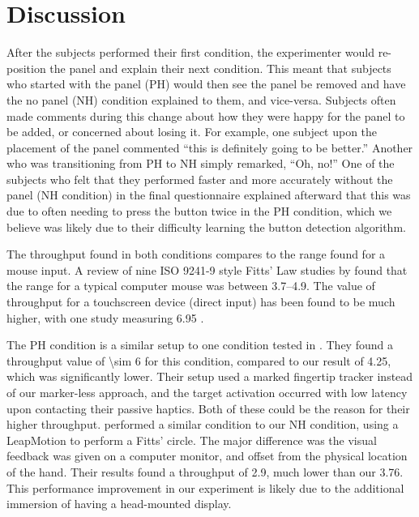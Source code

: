 \section{Discussion}

After the subjects performed their first condition, the experimenter would re-position the panel and explain their next condition.
This meant that subjects who started with the panel (PH) would then see the panel be removed and have the no panel (NH) condition explained to them, and vice-versa.
Subjects often made comments during this change about how they were happy for the panel to be added, or concerned about losing it.
For example, one subject upon the placement of the panel commented ``this is definitely going to be better.''
Another who was transitioning from PH to NH simply remarked, ``Oh, no!''
One of the subjects who felt that they performed faster and more accurately without the panel (NH condition) in the final questionnaire explained afterward that this was due to often needing to press the button twice in the PH condition, which we believe was likely due to their difficulty learning the button detection algorithm.

The throughput found in both conditions compares to the range found for a mouse input.
A review of nine ISO 9241-9 style Fitts' Law studies by \citet{soukoreff_towards_2004} found that the range for a typical computer mouse was between \SIrange[range-phrase = {~and~}]{3.7}{4.9}{\bps}.
The value of throughput for a touchscreen device (direct input) has been found to be much higher, with one study measuring \SI{6.95}{\bps} \citep{mackenzie_fitts_2015}.

The PH condition is a similar setup to one condition tested in \citet{kohli_redirected_2012}.
They found a throughput value of \SI{\sim 6}{\bps} for this condition, compared to our result of \SI{4.25}{\bps}, which was significantly lower.
Their setup used a marked fingertip tracker instead of our marker-less approach, and the target activation occurred with low latency upon contacting their passive haptics.
Both of these could be the reason for their higher throughput.
\citet{seixas_one_2015} performed a similar condition to our NH condition, using a LeapMotion to perform a Fitts' circle.
The major difference was the visual feedback was given on a computer monitor, and offset from the physical location of the hand.
Their results found a throughput of \SI{2.9}{\bps}, much lower than our \SI{3.76}{\bps}.
This performance improvement in our experiment is likely due to the additional immersion of having a head-mounted display.

